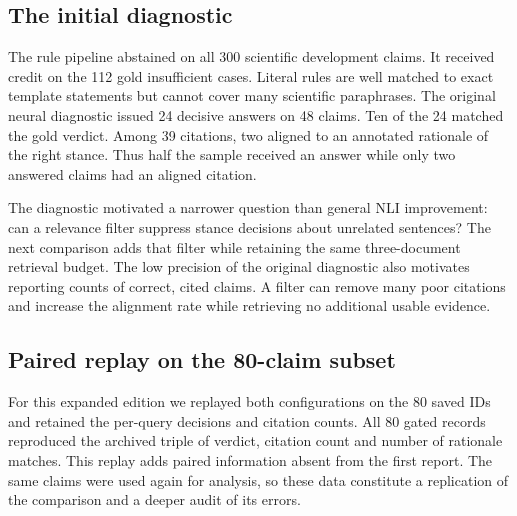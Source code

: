 \subsection{The initial diagnostic}
The rule pipeline abstained on all 300 scientific development claims. It received credit on the 112 gold insufficient cases. Literal rules are well matched to exact template statements but cannot cover many scientific paraphrases. The original neural diagnostic issued 24 decisive answers on 48 claims. Ten of the 24 matched the gold verdict. Among 39 citations, two aligned to an annotated rationale of the right stance. Thus half the sample received an answer while only two answered claims had an aligned citation.

The diagnostic motivated a narrower question than general NLI improvement: can a relevance filter suppress stance decisions about unrelated sentences? The next comparison adds that filter while retaining the same three-document retrieval budget. The low precision of the original diagnostic also motivates reporting counts of correct, cited claims. A filter can remove many poor citations and increase the alignment rate while retrieving no additional usable evidence.

\subsection{Paired replay on the 80-claim subset}
For this expanded edition we replayed both configurations on the 80 saved IDs and retained the per-query decisions and citation counts. All 80 gated records reproduced the archived triple of verdict, citation count and number of rationale matches. This replay adds paired information absent from the first report. The same claims were used again for analysis, so these data constitute a replication of the comparison and a deeper audit of its errors.

